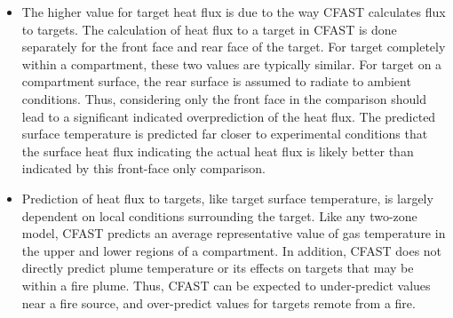 \begin{itemize}
\item The higher value for target heat flux is due to the way CFAST calculates flux to targets.  The calculation of heat flux to a target in CFAST is done separately for the front face and rear face of the target.  For target completely within a compartment, these two values are typically similar.  For target on a compartment surface, the rear surface is assumed to radiate to ambient conditions.  Thus, considering only the front face in the comparison should lead to a significant indicated overprediction of the heat flux. The predicted surface temperature is predicted far closer to experimental conditions that the surface heat flux indicating the actual heat flux is likely better than indicated by this front-face only comparison. 
\item  Prediction of heat flux to targets, like target surface temperature, is largely dependent on local conditions surrounding the target.  Like any two-zone model, CFAST predicts an average representative value of gas temperature in the upper and lower regions of a compartment.  In addition, CFAST does not directly predict plume temperature or its effects on targets that may be within a fire plume.  Thus, CFAST can be expected to under-predict values near a fire source, and over-predict values for targets remote from a fire.
\end{itemize}

